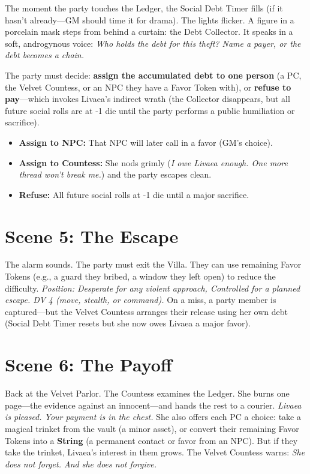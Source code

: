 \documentclass[12pt]{book}
\begin{document}
The moment the party touches the Ledger, the Social Debt Timer fills (if it hasn't already---GM should time it for drama). The lights flicker. A figure in a porcelain mask steps from behind a curtain: the Debt Collector. It speaks in a soft, androgynous voice: \textit{Who holds the debt for this theft? Name a payer, or the debt becomes a chain.}

The party must decide: \textbf{assign the accumulated debt to one person} (a PC, the Velvet Countess, or an NPC they have a Favor Token with), or \textbf{refuse to pay}---which invokes Livaea's indirect wrath (the Collector disappears, but all future social rolls are at -1 die until the party performs a public humiliation or sacrifice).

\begin{itemize}
    \item \textbf{Assign to NPC:} That NPC will later call in a favor (GM's choice).
    \item \textbf{Assign to Countess:} She nods grimly (\textit{I owe Livaea enough. One more thread won't break me.}) and the party escapes clean.
    \item \textbf{Refuse:} All future social rolls at -1 die until a major sacrifice.
\end{itemize}

\section{Scene 5: The Escape}

The alarm sounds. The party must exit the Villa. They can use remaining Favor Tokens (e.g., a guard they bribed, a window they left open) to reduce the difficulty. \textit{Position: Desperate for any violent approach, Controlled for a planned escape. DV 4 (move, stealth, or command).} On a miss, a party member is captured---but the Velvet Countess arranges their release using her own debt (Social Debt Timer resets but she now owes Livaea a major favor).

\section{Scene 6: The Payoff}

Back at the Velvet Parlor. The Countess examines the Ledger. She burns one page---the evidence against an innocent---and hands the rest to a courier. \textit{Livaea is pleased. Your payment is in the chest.} She also offers each PC a choice: take a magical trinket from the vault (a minor asset), or convert their remaining Favor Tokens into a \textbf{String} (a permanent contact or favor from an NPC). But if they take the trinket, Livaea's interest in them grows. The Velvet Countess warns: \textit{She does not forget. And she does not forgive.}
\end{document}
